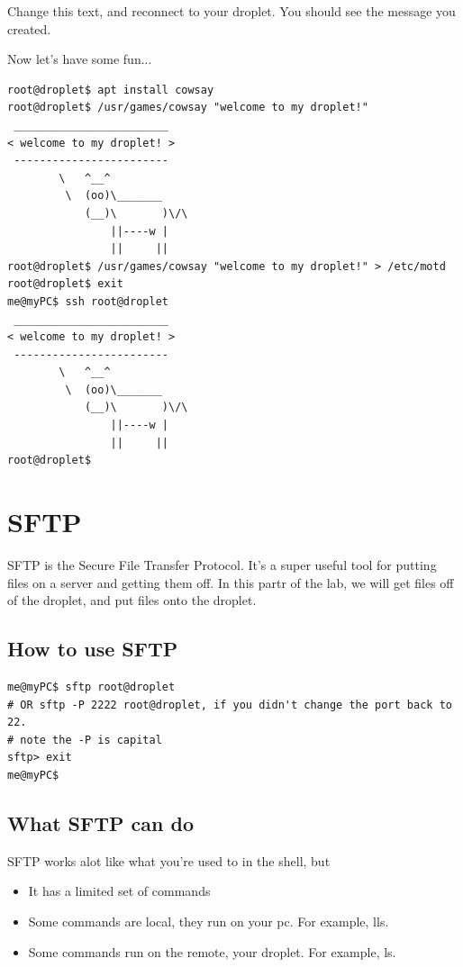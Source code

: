 \documentclass[12pt]{article}
\begin{document}
Change this text, and reconnect to your droplet. You should see the message you created.

Now let's have some fun...

 \begin{lstlisting}[style=term]
root@droplet$ apt install cowsay
root@droplet$ /usr/games/cowsay "welcome to my droplet!"
 ________________________
< welcome to my droplet! >
 ------------------------
        \   ^__^
         \  (oo)\_______
            (__)\       )\/\
                ||----w |
                ||     ||
root@droplet$ /usr/games/cowsay "welcome to my droplet!" > /etc/motd
root@droplet$ exit
me@myPC$ ssh root@droplet
 ________________________
< welcome to my droplet! >
 ------------------------
        \   ^__^
         \  (oo)\_______
            (__)\       )\/\
                ||----w |
                ||     ||
root@droplet$
\end{lstlisting}

\section{SFTP}
SFTP is the Secure File Transfer Protocol. It's a super useful tool for putting files on a server
and getting them off. In this partr of the lab, we will get files off of the droplet, and put files onto the
droplet.

\subsection{How to use SFTP}
\begin{lstlisting}[style=term]
me@myPC$ sftp root@droplet
# OR sftp -P 2222 root@droplet, if you didn't change the port back to 22. 
# note the -P is capital
sftp> exit
me@myPC$ 

\end{lstlisting}
\subsection{What SFTP can do}

SFTP works alot like what you're used to in the shell, but
\begin{itemize}
\item It has a limited set of commands
\item Some commands are local, they run on your pc. For example, lls.
\item Some commands run on the remote, your droplet. For example, ls.
\end{itemize}
\end{document}
